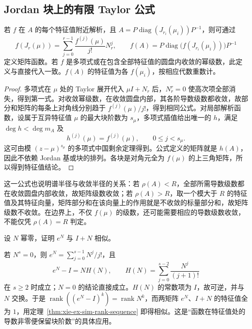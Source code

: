 \subsection{Jordan 块上的有限 Taylor 公式}

\begin{theorem}
\label{thm:xie-ex-sim-functional-calculus}
若 $f$ 在 $A$ 的每个特征值附近解析，且 $A=P\operatorname{diag}(J_{r_i}(\mu_i))P^{-1}$，则可通过
\begin{equation}
 f(J_r(\mu))=\sum_{j=0}^{r-1}\frac{f^{(j)}(\mu)}{j!}N_r^j,
 \qquad
 f(A)=P\operatorname{diag}\bigl(f(J_{r_i}(\mu_i))\bigr)P^{-1}
 \label{eq:xie-ex-sim-taylor}
\end{equation}
定义矩阵函数。若 $f$ 是多项式或在包含全部特征值的圆盘内收敛的幂级数，此定义与直接代入一致。$f(A)$ 的特征值为各 $f(\mu_i)$，按相应代数重数计。
\end{theorem}
\begin{proof}
多项式在 $\mu$ 处的 Taylor 展开代入 $\mu I+N_r$ 后，$N_r^r=0$ 使高次项全部消失，得到第一式。对收敛幂级数，在收敛圆盘内部，其各阶导数级数都收敛，故部分和矩阵的每条上对角线分别趋于 $f^{(j)}(\mu)/j!$，得到相同公式。对局部解析函数，设属于互异特征值 $\mu$ 的最大块阶数为 $s_\mu$，多项式插值给出唯一的 $h$，满足 $\deg h<\deg m_A$ 及
\[
 h^{(j)}(\mu)=f^{(j)}(\mu),\qquad 0\leq j<s_\mu.
\]
这可由模 $(z-\mu)^{s_\mu}$ 的多项式中国剩余定理得到。公式定义的矩阵就是 $h(A)$，因此不依赖 Jordan 基或块的排列。各块是对角元全为 $f(\mu)$ 的上三角矩阵，所以得到特征值结论。
\end{proof}

这一公式也说明谱半径与收敛半径的关系：若 $\rho(A)<R$，全部所需导数级数都在收敛圆盘内部收敛，故矩阵级数收敛；若 $\rho(A)>R$，取一个模大于 $R$ 的特征值及其特征向量，矩阵部分和在该向量上的作用就是不收敛的标量部分和，故矩阵级数不收敛。在边界上，不仅 $f(\mu)$ 的级数，还可能需要相应的导数级数收敛，不能仅凭 $\rho(A)=R$ 判定。

\begin{example}
设 $N$ 幂零，证明 $e^N$ 与 $I+N$ 相似。
\end{example}
\begin{solve}
若 $N^s=0$，则 $e^N=\sum_{j=0}^{s-1}N^j/j!$，且
\[
 e^N-I=NH(N),\qquad H(N)=\sum_{j=0}^{s-2}\frac{N^j}{(j+1)!}
\]
在 $s\geq2$ 时成立；$N=0$ 的结论直接成立。$H(N)$ 的常数项为 $I$，故可逆，并与 $N$ 交换。于是 $\operatorname{rank}((e^N-I)^k)=\operatorname{rank}N^k$，而两矩阵 $e^N$、$I+N$ 的特征值全为 $1$，用定理~\ref{thm:xie-ex-sim-rank-sequence} 即得相似。这是“函数在特征值处的导数非零便保留块阶数”的具体应用。
\end{solve}

